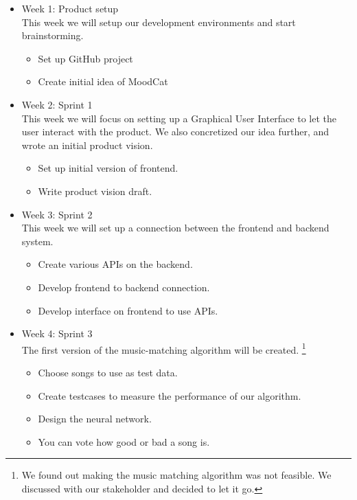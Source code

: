 \begin{itemize}
\item Week 1: Product setup\\
This week we will setup our development environments and start brainstorming.

\begin{itemize}
\item Set up GitHub project \cite{githubRepo}
\item Create initial idea of MoodCat
\end{itemize}

\item Week 2: Sprint 1\\
This week we will focus on setting up a Graphical User Interface to let the user interact with the product.
We also concretized our idea further, and wrote an initial product vision.

\begin{itemize}
\item Set up initial version of frontend.
\item Write product vision draft.
\end{itemize}

\item Week 3: Sprint 2\\
This week we will set up a connection between the frontend and backend system.

\begin{itemize}
\item Create various APIs on the backend.
\item Develop frontend to backend connection.
\item Develop interface on frontend to use \gls{APIs}.
\end{itemize}

\item Week 4: Sprint 3\\
The first version of the music-matching algorithm will be created. \footnote{We found out making the music matching algorithm was not feasible. We discussed with our stakeholder and decided to let it go.}

\begin{itemize}
\item Choose songs to use as test data.
\item Create testcases to measure the performance of our algorithm.
\item Design the neural network. 
\item You can vote how good or bad a song is.
\end{itemize}


\end{itemize}
